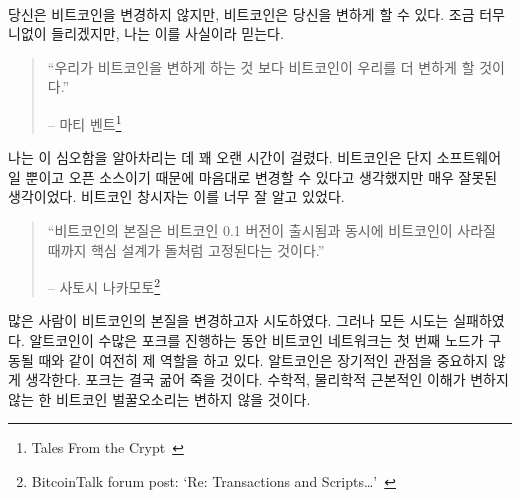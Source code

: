 \paragraph{}
당신은 비트코인을 변경하지 않지만, 비트코인은 당신을 변하게 할 수 있다.
조금 터무니없이 들리겠지만, 나는 이를 사실이라 믿는다.


\begin{quotation}\begin{samepage}
\enquote{우리가 비트코인을 변하게 하는 것 보다 비트코인이 우리를 더 변하게 할 것이다.}
\begin{flushright} -- 마티 벤트\footnote{Tales From the Crypt~\cite{tftc21}}
\end{flushright}\end{samepage}\end{quotation}

나는 이 심오함을 알아차리는 데 꽤 오랜 시간이 걸렸다.
비트코인은 단지 소프트웨어일 뿐이고 오픈 소스이기 때문에 
마음대로 변경할 수 있다고 생각했지만 매우 잘못된 생각이었다. 
비트코인 창시자는 이를 너무 잘 알고 있었다.

\begin{quotation}\begin{samepage}
\enquote{비트코인의 본질은 비트코인 0.1 버전이 출시됨과 동시에 비트코인이 사라질 때까지 
핵심 설계가 돌처럼 고정된다는 것이다.}
\begin{flushright} -- 사토시 나카모토\footnote{BitcoinTalk forum post: `Re:
Transactions and Scripts\ldots'~\cite{satoshi-set-in-stone}}
\end{flushright}\end{samepage}\end{quotation}

많은 사람이 비트코인의 본질을 변경하고자 시도하였다. 그러나 모든 시도는 실패하였다. 알트코인이 수많은
포크를 진행하는 동안 비트코인 네트워크는 첫 번째 노드가 구동될 때와 같이 여전히 제 역할을 하고 있다.
알트코인은 장기적인 관점을 중요하지 않게 생각한다. 포크는 결국 굶어 죽을 것이다. 수학적, 물리학적 근본적인 
이해가 변하지 않는 한 비트코인 벌꿀오소리는 변하지 않을 것이다.

